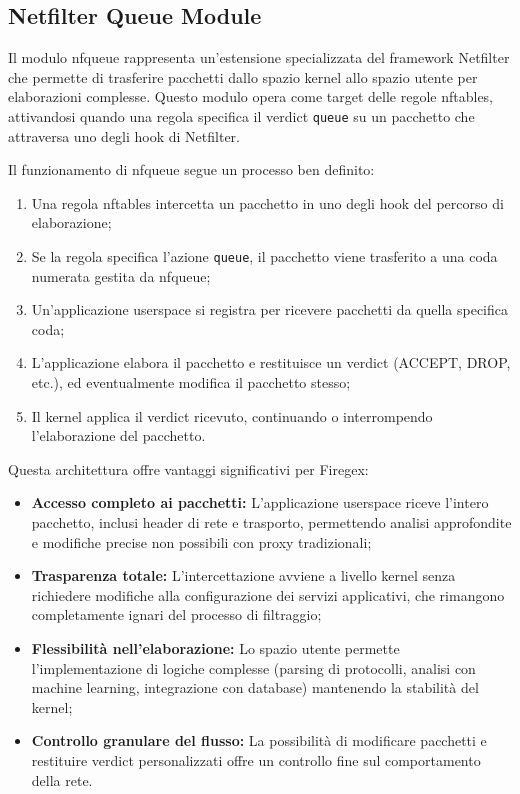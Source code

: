 \subsection{Netfilter Queue Module}

Il modulo \gls{nfqueue} rappresenta un'estensione specializzata del framework Netfilter che permette di trasferire pacchetti dallo spazio kernel allo spazio utente per elaborazioni complesse. Questo modulo opera come target delle regole \gls{nftables}, attivandosi quando una regola specifica il verdict \texttt{queue} su un pacchetto che attraversa uno degli hook di Netfilter.

Il funzionamento di \gls{nfqueue} segue un processo ben definito:

\begin{enumerate}
    \setlength{\itemsep}{1pt}
    \setlength{\parskip}{1pt}
    \item Una regola \gls{nftables} intercetta un pacchetto in uno degli hook del percorso di elaborazione;
    \item Se la regola specifica l'azione \texttt{queue}, il pacchetto viene trasferito a una coda numerata gestita da \gls{nfqueue};
    \item Un'applicazione userspace si registra per ricevere pacchetti da quella specifica coda;
    \item L'applicazione elabora il pacchetto e restituisce un verdict (ACCEPT, DROP, etc.), ed eventualmente modifica il pacchetto stesso;
    \item Il kernel applica il verdict ricevuto, continuando o interrompendo l'elaborazione del pacchetto.
\end{enumerate}

Questa architettura offre vantaggi significativi per Firegex:

\begin{itemize}
    \setlength{\itemsep}{1pt}
    \setlength{\parskip}{1pt}
    \item \textbf{Accesso completo ai pacchetti:} L'applicazione userspace riceve l'intero pacchetto, inclusi header di rete e trasporto, permettendo analisi approfondite e modifiche precise non possibili con proxy tradizionali;
    
    \item \textbf{Trasparenza totale:} L'intercettazione avviene a livello kernel senza richiedere modifiche alla configurazione dei servizi applicativi, che rimangono completamente ignari del processo di filtraggio;
    
    \item \textbf{Flessibilità nell'elaborazione:} Lo spazio utente permette l'implementazione di logiche complesse (parsing di protocolli, analisi con machine learning, integrazione con database) mantenendo la stabilità del kernel;
    
    \item \textbf{Controllo granulare del flusso:} La possibilità di modificare pacchetti e restituire verdict personalizzati offre un controllo fine sul comportamento della rete.
\end{itemize}

